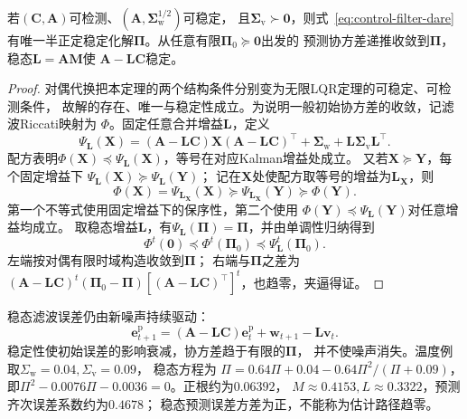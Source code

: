 \begin{theorem}[稳态预测滤波的充分条件]
\label{thm:control-steady-filter}
若$(\bm C,\bm A)$可检测、$(\bm A,\bm\Sigma_{\mathrm w}^{1/2})$可稳定，
且$\bm\Sigma_{\mathrm v}\succ\bm0$，则式~\eqref{eq:control-filter-dare}
有唯一半正定稳定化解$\bm\Pi$。从任意有限$\bm\Pi_0\succeq\bm0$出发的
预测协方差递推收敛到$\bm\Pi$，稳态$\bm L=\bm A\bm M$使
$\bm A-\bm L\bm C$稳定。
\end{theorem}
\begin{proof}
对偶代换把本定理的两个结构条件分别变为无限LQR定理的可稳定、可检测条件，
故解的存在、唯一与稳定性成立。为说明一般初始协方差的收敛，记滤波Riccati映射为
$\Phi$。固定任意合并增益$\bm L$，定义
\[
  \Psi_{\bm L}(\bm X)
  =(\bm A-\bm L\bm C)\bm X(\bm A-\bm L\bm C)^\top+
     \bm\Sigma_{\mathrm w}+\bm L\bm\Sigma_{\mathrm v}\bm L^\top.
\]
配方表明$\Phi(\bm X)\preceq\Psi_{\bm L}(\bm X)$，等号在对应Kalman增益处成立。
又若$\bm X\succeq\bm Y$，每个固定增益下
$\Psi_{\bm L}(\bm X)\succeq\Psi_{\bm L}(\bm Y)$；
记在$\bm X$处使配方取等号的增益为$\bm L_{\bm X}$，则
\[
  \Phi(\bm X)=\Psi_{\bm L_{\bm X}}(\bm X)
  \succeq\Psi_{\bm L_{\bm X}}(\bm Y)
  \succeq\Phi(\bm Y).
\]
第一个不等式使用固定增益下的保序性，第二个使用
$\Phi(\bm Y)\preceq\Psi_{\bm L}(\bm Y)$对任意增益均成立。
取稳态增益$\bm L$，有$\Psi_{\bm L}(\bm\Pi)=\bm\Pi$，并由单调性归纳得到
\[
  \Phi^t(\bm0)\preceq\Phi^t(\bm\Pi_0)
                     \preceq\Psi_{\bm L}^t(\bm\Pi_0).
\]
左端按对偶有限时域构造收敛到$\bm\Pi$；
右端与$\bm\Pi$之差为
$(\bm A-\bm L\bm C)^t(\bm\Pi_0-\bm\Pi)
 [(\bm A-\bm L\bm C)^\top]^t$，也趋零，夹逼得证。
\end{proof}

稳态滤波误差仍由新噪声持续驱动：
\[
  \bm e_{t+1}^{\mathrm p}
  =(\bm A-\bm L\bm C)\bm e_t^{\mathrm p}
     +\bm w_{t+1}-\bm L\bm v_t.
\]
稳定性使初始误差的影响衰减，协方差趋于有限的$\bm\Pi$，
并不使噪声消失。温度例取$\Sigma_{\mathrm w}=0.04,\Sigma_{\mathrm v}=0.09$，
稳态方程为
$\Pi=0.64\Pi+0.04-0.64\Pi^2/(\Pi+0.09)$，
即$\Pi^2-0.0076\Pi-0.0036=0$。正根约为$0.06392$，
$M\approx0.4153,L\approx0.3322$，预测齐次误差系数约为$0.4678$；
稳态预测误差方差为正，不能称为估计路径趋零。

